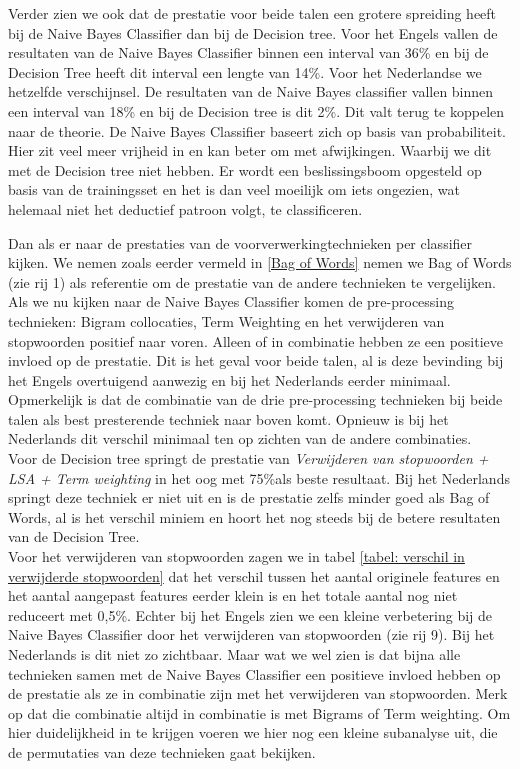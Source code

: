 Verder zien we ook dat de prestatie voor beide talen een grotere spreiding heeft bij de Naive Bayes Classifier dan bij de Decision tree. Voor het Engels vallen de resultaten van de Naive Bayes Classifier binnen een interval van 36\% en bij de Decision Tree heeft dit interval een lengte van 14\%. Voor het Nederlandse we hetzelfde verschijnsel. De resultaten van de Naive Bayes classifier vallen binnen een interval van 18\% en bij de Decision tree is dit 2\%. Dit valt terug te koppelen naar de theorie. De Naive Bayes Classifier baseert zich op basis van probabiliteit. Hier zit veel meer vrijheid in en kan beter om met afwijkingen. Waarbij we dit met de Decision tree niet hebben. Er wordt een beslissingsboom opgesteld op basis van de trainingsset en het is dan veel moeilijk om iets ongezien, wat helemaal niet het deductief patroon volgt, te classificeren.

Dan als er naar de prestaties van de voorverwerkingtechnieken per classifier kijken. We nemen zoals eerder vermeld in \ref{Bag of Words} nemen we Bag of Words (zie rij 1) als referentie om de prestatie van de andere technieken te vergelijken.\\
Als we nu kijken naar de Naive Bayes Classifier komen de pre-processing technieken: Bigram collocaties, Term Weighting en het verwijderen van stopwoorden positief naar voren. Alleen of in combinatie hebben ze een positieve invloed op de prestatie. Dit is het geval voor beide talen, al is deze bevinding bij het Engels overtuigend aanwezig en bij het Nederlands eerder minimaal. Opmerkelijk is dat de combinatie van de drie pre-processing technieken bij beide talen als best presterende techniek naar boven komt. Opnieuw is bij het Nederlands dit verschil minimaal ten op zichten van de andere combinaties.\\
Voor de Decision tree springt de prestatie van \textit{Verwijderen van stopwoorden + LSA + Term weighting} in het oog met 75\%als beste resultaat. Bij het Nederlands springt deze techniek er niet uit en is de prestatie zelfs minder goed als Bag of Words, al is het verschil miniem en hoort het nog steeds bij de betere resultaten van de Decision Tree.\\

Voor het verwijderen van stopwoorden zagen we in tabel \ref{tabel: verschil in verwijderde stopwoorden} dat het verschil tussen het aantal originele features en het aantal aangepast features eerder klein is en het totale aantal nog niet reduceert met 0,5\%. Echter bij het Engels zien we een kleine verbetering bij de Naive Bayes Classifier door het verwijderen van stopwoorden (zie rij 9). Bij het Nederlands is dit niet zo zichtbaar. Maar wat we wel zien is dat bijna alle technieken samen met de Naive Bayes Classifier een positieve invloed hebben op de prestatie als ze in combinatie zijn met het verwijderen van stopwoorden. Merk op dat die combinatie altijd in combinatie is met Bigrams of  Term weighting. Om hier duidelijkheid in te krijgen voeren we hier nog een kleine subanalyse uit, die de permutaties van deze technieken gaat bekijken.


